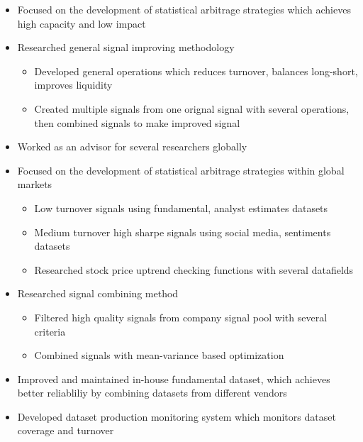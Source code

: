 \documentclass[11pt,a4paper,sans]{moderncv}        %
\begin{document}
{\begin{itemize}%
    \item Focused on the development of statistical arbitrage strategies which achieves high capacity and low impact
    \item Researched general signal improving methodology
        \begin{itemize}%
            \item Developed general operations which reduces turnover, balances long-short, improves liquidity
            \item Created multiple signals from one orignal signal with several operations, then combined signals to make improved signal
        \end{itemize}
    \item Worked as an advisor for several researchers globally
\end{itemize}}

{\begin{itemize}%
    \item Focused on the development of statistical arbitrage strategies within global markets
        \begin{itemize}%
            \item Low turnover signals using fundamental, analyst estimates datasets
            \item Medium turnover high sharpe signals using social media, sentiments datasets
            \item Researched stock price uptrend checking functions with several datafields
        \end{itemize}
    \item Researched signal combining method
        \begin{itemize}%
            \item Filtered high quality signals from company signal pool with several criteria
            \item Combined signals with mean-variance based optimization
        \end{itemize}
\end{itemize}}

{\begin{itemize}%
    \item Improved and maintained in-house fundamental dataset, which achieves better reliabliliy by combining datasets from different vendors
    \item Developed dataset production monitoring system which monitors dataset coverage and turnover
\end{itemize}}
\end{document}
